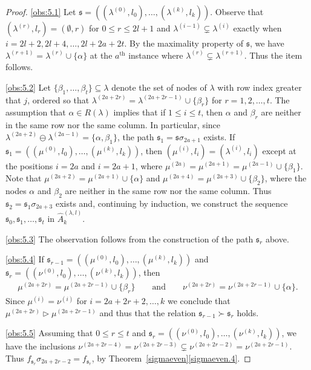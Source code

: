 \documentclass[11pt,a4paper,reqno,svgnames]{amsart}
\theoremstyle{plain}
\theoremstyle{definition}
\numberwithin{equation}{section}
\begin{document}
\begin{proof}
\eqref{obs:5.1} Let $\mathfrak{s}=((\lambda^{(0)},l_0),\ldots,(\lambda^{(k)},l_k))$. Observe that $(\lambda^{(r)},l_{r})=(\emptyset,r)$ for $0{\leqslant} r{\leqslant} 2l+1$ and $\lambda^{(i-1)}\subsetneq\lambda^{(i)}$ exactly when $i=2l+2,2l+4,\ldots,2l+2a+2t.$ By the maximality property of $\mathfrak{s}$, we have $\lambda^{(r+1)}=\lambda^{(r)}\cup \lbrace\alpha\rbrace$ at the $a^\text{th}$ instance where $\lambda^{(r)}\subsetneq\lambda^{(r+1)}$. Thus the item  follows.

\eqref{obs:5.2} Let $\lbrace\beta_1,\ldots,\beta_{t}\rbrace\subseteq\lambda$ denote the set of nodes of $\lambda$ with row index greater that $j$, ordered so that $\lambda^{(2a+2r)}=\lambda^{(2a+2r-1)}\cup\lbrace \beta_{r}\rbrace$ for $r=1,2,\ldots,t$. The assumption that $\alpha\in R(\lambda)$ implies that if  $1{\leqslant} i{\leqslant} t$, then  $\alpha$ and $\beta_r$ are neither in the same row nor the same column. In particular, since $\lambda^{(2a+2)}\ominus\lambda^{(2a-1)}=\lbrace\alpha,\beta_1\rbrace$, the path $\mathfrak{s}_1=\mathfrak{s}\sigma_{2a+1}$ exists. If $\mathfrak{s}_1=((\mu^{(0)},l_0),\ldots,(\mu^{(k)},l_k))$, then $(\mu^{(i)},l_i)=(\lambda^{(i)},l_i)$ except at the positions $i=2a$ and $i=2a+1$,  where $\mu^{(2a)}=\mu^{(2a+1)}=\mu^{(2a-1)}\cup\lbrace\beta_1\rbrace$. Note that $\mu^{(2a+2)}=\mu^{(2a+1)}\cup\lbrace\alpha\rbrace$ and $\mu^{(2a+4)}=\mu^{(2a+3)}\cup\lbrace\beta_2\rbrace$, where the nodes $\alpha$ and $\beta_2$ are neither in the same row nor the same column. Thus $\mathfrak{s}_2=\mathfrak{s}_1\sigma_{2a+3}$ exists and, continuing by induction, we construct the sequence $\mathfrak{s}_0,\mathfrak{s}_1,\ldots,\mathfrak{s}_t$ in $\hat{A}_k^{(\lambda,l)}$. 

\eqref{obs:5.3} The observation follows from the construction of the path $\mathfrak{s}_r$ above. 

\eqref{obs:5.4} 
If $\mathfrak{s}_{r-1}=((\mu^{(0)},l_0),\ldots,(\mu^{(k)},l_k))$ and $\mathfrak{s}_{r}=((\nu^{(0)},l_0),\ldots,(\nu^{(k)},l_k))$, then 
\begin{align*}
\mu^{(2a+2r)}=\mu^{(2a+2r-1)}\cup\lbrace\beta_r\rbrace\qquad\text{and}\qquad \nu^{(2a+2r)}=\nu^{(2a+2r-1)}\cup\lbrace\alpha\rbrace.
\end{align*}
Since $\mu^{(i)}=\nu^{(i)}$ for $i=2a+2r+2,\ldots,k$ we conclude that $\mu^{(2a+2r)}\rhd\mu^{(2a+2r-1)}$ and thus that the relation $\mathfrak{s}_{r-1}\succ\mathfrak{s}_r$ holds.

\eqref{obs:5.5} Assuming that $0{\leqslant} r{\leqslant} t$ and $\mathfrak{s}_r=((\nu^{(0)},l_0),\ldots,(\nu^{(k)},l_k))$, we have the inclusions $\nu^{(2a+2r-4)}=\nu^{(2a+2r-3)}\subsetneq \nu^{(2a+2r-2)}=\nu^{(2a+2r-1)}$. Thus $f_{\mathfrak{s}_r}\sigma_{2a+2r-2}=f_{\mathfrak{s}_r}$, by  Theorem~\ref{sigmaeven}\eqref{sigmaeven.4}. 


\end{proof}
\end{document}
